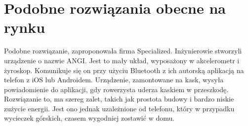 \section{Podobne rozwiązania obecne na rynku}
Podobne rozwiązanie, zaproponowała firma Specialized. Inżynierowie stworzyli urządzenie o nazwie ANGI. Jest to mały układ, wyposażony w akcelerometr i żyroskop. Komunikuje się on przy użyciu Bluetooth z ich autorską aplikacją na telefon z iOS lub Androidem. Urządzenie, zamontowane na kask, wysyła powiadomienie do aplikacji, gdy rowerzysta uderza kaskiem w przeszkodę. Rozwiązanie to, ma szereg zalet, takich jak prostota budowy i bardzo niskie zużycie energii. Jest ono jednak uzależnione od telefonu, który w przypadku wycieczek górskich, czasem wygodniej zostawić w domu.















